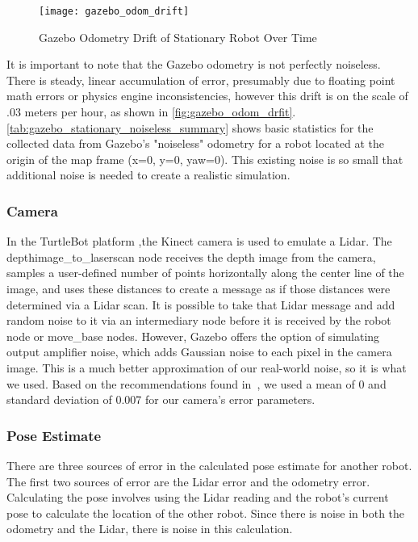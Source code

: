 \documentclass[thesis.tex]{subfile}
\begin{document}


\begin{figure}
\centering
\texttt{[image: gazebo\_odom\_drift]}
\caption{Gazebo Odometry Drift of Stationary Robot Over Time}
\label{fig:gazebo_odom_drfit}
\end{figure}


It is important to note that the Gazebo odometry is not perfectly noiseless. There is steady, linear accumulation of error, presumably due to floating point math errors or physics engine inconsistencies, however this drift is on the scale of $.03$ meters per hour, as shown in \autoref{fig:gazebo_odom_drfit}. \autoref{tab:gazebo_stationary_noiseless_summary} shows basic statistics for the collected data from Gazebo's "noiseless" odometry for a robot located at the origin of the map frame (x=0, y=0, yaw=0). This existing noise is so small that additional noise is needed to create a realistic simulation.


\subsubsection{Camera}
In the TurtleBot platform ,the Kinect camera is used to emulate a Lidar. The depthimage\_to\_laserscan node receives the depth image from the camera, samples a user-defined number of points horizontally along the center line of the image, and uses these distances to create a message as if those distances were determined via a Lidar scan. It is possible to take that Lidar message and add random noise to it via an intermediary node before it is received by the robot node or move\_base nodes. However, Gazebo offers the option of simulating output amplifier noise, which adds Gaussian noise to each pixel in the camera image. This is a much better approximation of our real-world noise, so it is what we used. Based on the recommendations found in~\cite{GazeboSensorNoise}, we used a mean of 0 and standard deviation of 0.007 for our camera's error parameters.

\subsubsection{Pose Estimate}
There are three sources of error in the calculated pose estimate for another robot. The first two sources of error are the Lidar error and the odometry error. Calculating the pose involves using the Lidar reading and the robot's current pose to calculate the location of the other robot. Since there is noise in both the odometry and the Lidar, there is noise in this calculation.
\end{document}
